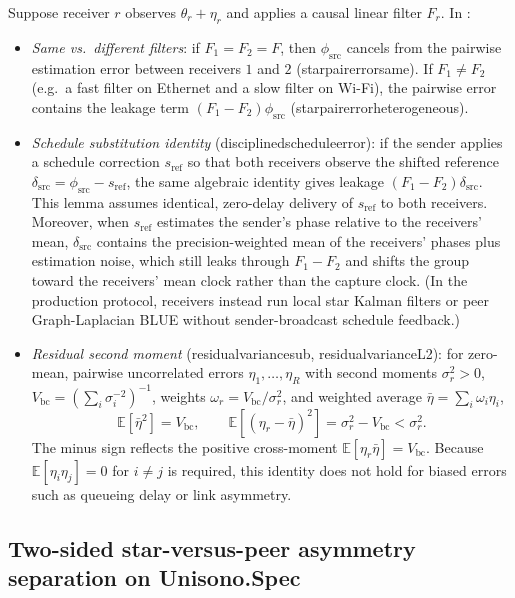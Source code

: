 \documentclass[11pt,a4paper]{article}
\DeclareRobustCommand{\lean}[1]{{\ttfamily\def\_{\textunderscore\allowbreak}#1}}
\newcommand{\E}{\mathbb{E}}
\theoremstyle{definition}
\begin{document}
Suppose receiver $r$ observes $\theta_r + \eta_r$ and applies a causal linear
filter $F_r$. In :
\begin{itemize}
\item \emph{Same vs.\ different filters}: if $F_1 = F_2 = F$, then
  $\phi_{\mathrm{src}}$ cancels from the pairwise estimation error between
  receivers $1$ and $2$ (\lean{star\_pair\_error\_same}). If $F_1 \ne F_2$
  (e.g.\ a fast filter on Ethernet and a slow filter on Wi-Fi), the pairwise
  error contains the leakage term $(F_1 - F_2)\phi_{\mathrm{src}}$
  (\lean{star\_pair\_error\_heterogeneous}).
\item \emph{Schedule substitution identity}
  (\lean{disciplined\_schedule\_error}): if the sender applies a schedule
  correction $s_{\mathrm{ref}}$ so that both receivers observe the shifted
  reference $\delta_{\mathrm{src}} = \phi_{\mathrm{src}} - s_{\mathrm{ref}}$,
  the same algebraic identity gives leakage $(F_1 - F_2)\delta_{\mathrm{src}}$.
  This lemma assumes identical, zero-delay delivery of $s_{\mathrm{ref}}$ to
  both receivers. Moreover, when $s_{\mathrm{ref}}$ estimates the sender's
  phase relative to the receivers' mean, $\delta_{\mathrm{src}}$ contains the
  precision-weighted mean of the receivers' phases plus estimation noise, which
  still leaks through $F_1 - F_2$ and shifts the group toward the receivers'
  mean clock rather than the capture clock. (In the production protocol,
  receivers instead run local star Kalman filters or peer Graph-Laplacian
  BLUE without sender-broadcast schedule feedback.)
\item \emph{Residual second moment} (\lean{residual\_variance\_sub},
  \lean{residual\_variance\_L2}): for zero-mean, pairwise uncorrelated errors
  $\eta_1, \dots, \eta_R$ with second moments $\sigma_r^2 > 0$,
  $V_{\mathrm{bc}} = (\sum_i \sigma_i^{-2})^{-1}$, weights
  $\omega_r = V_{\mathrm{bc}} / \sigma_r^2$, and weighted average
  $\bar\eta = \sum_i \omega_i \eta_i$,
  \[
    \E[\bar\eta^2] = V_{\mathrm{bc}},
    \qquad
    \E[(\eta_r - \bar\eta)^2] = \sigma_r^2 - V_{\mathrm{bc}} < \sigma_r^2 .
  \]
  The minus sign reflects the positive cross-moment
  $\E[\eta_r \bar\eta] = V_{\mathrm{bc}}$. Because $\E[\eta_i \eta_j] = 0$ for
  $i \ne j$ is required, this identity does not hold for biased errors such as
  queueing delay or link asymmetry.
\end{itemize}

\subsection{Two-sided star-versus-peer asymmetry separation on \lean{Unisono.Spec}}
\end{document}
